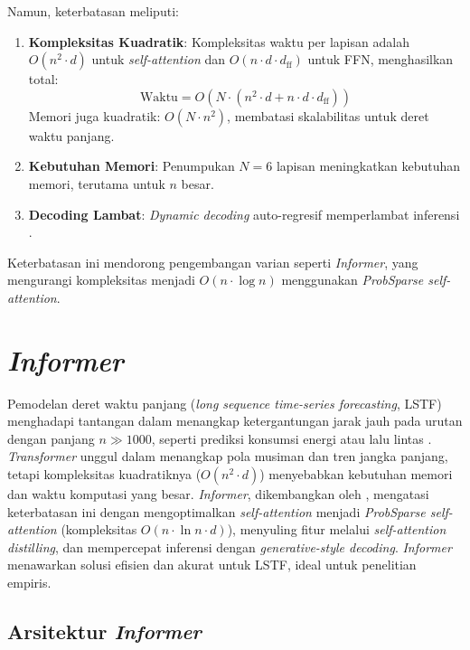 Namun, keterbatasan meliputi:
\begin{enumerate}
    \item \textbf{Kompleksitas Kuadratik}: Kompleksitas waktu per lapisan adalah \( O(n^2 \cdot d) \) untuk \textit{self-attention} dan \( O(n \cdot d \cdot d_{\text{ff}}) \) untuk FFN, menghasilkan total:
    \begin{equation}
    \text{Waktu} = O(N \cdot (n^2 \cdot d + n \cdot d \cdot d_{\text{ff}}))
    \end{equation}
    Memori juga kuadratik: \( O(N \cdot n^2) \), membatasi skalabilitas untuk deret waktu panjang.
    \item \textbf{Kebutuhan Memori}: Penumpukan \( N=6 \) lapisan meningkatkan kebutuhan memori, terutama untuk \( n \) besar.
    \item \textbf{Decoding Lambat}: \textit{Dynamic decoding} auto-regresif memperlambat inferensi \citep{Zhou2021}.
\end{enumerate}
Keterbatasan ini mendorong pengembangan varian seperti \textit{Informer}, yang mengurangi kompleksitas menjadi \( O(n \cdot \log n) \) menggunakan \textit{ProbSparse self-attention}.

\section{\textit{Informer}}
\label{sec:informer}

Pemodelan deret waktu panjang (\textit{long sequence time-series forecasting}, LSTF) menghadapi tantangan dalam menangkap ketergantungan jarak jauh pada urutan dengan panjang \( n \gg 1000 \), seperti prediksi konsumsi energi atau lalu lintas \citep{Wu2021}. \textit{Transformer} \citep{Vaswani2017} unggul dalam menangkap pola musiman dan tren jangka panjang, tetapi kompleksitas kuadratiknya (\( O(n^2 \cdot d) \)) menyebabkan kebutuhan memori dan waktu komputasi yang besar. \textit{Informer}, dikembangkan oleh \citet{Zhou2021}, mengatasi keterbatasan ini dengan mengoptimalkan \textit{self-attention} menjadi \textit{ProbSparse self-attention} (kompleksitas \( O(n \cdot \ln n \cdot d) \)), menyuling fitur melalui \textit{self-attention distilling}, dan mempercepat inferensi dengan \textit{generative-style decoding}. \textit{Informer} menawarkan solusi efisien dan akurat untuk LSTF, ideal untuk penelitian empiris.

\subsection{Arsitektur \textit{Informer}}
\label{sec:informer_architecture}

